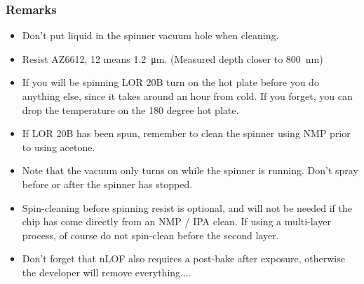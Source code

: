 \subsubsection{Remarks}
\begin{itemize}
\item Don't put liquid in the spinner vacuum hole when cleaning.
\item Resist AZ6612, 12 means \SI{1.2}{\micro\meter}. (Measured depth closer to \SI{800}{\nano\meter})
\item If you will be spinning LOR 20B turn on the hot plate before you do anything else, since it takes around an hour from cold. If you forget, you can drop the temperature on the 180 degree hot plate.
\item If LOR 20B has been spun, remember to clean the spinner using NMP prior to using acetone.
\item Note that the vacuum only turns on while the spinner is running. Don't spray before or after the spinner has stopped.
\item Spin-cleaning before spinning resist is optional, and will not be needed if the chip has come directly from an NMP / IPA clean. If using a multi-layer process, of course do not spin-clean before the second layer.
\item Don't forget that nLOF also requires a post-bake after exposure, otherwise the developer will remove everything....
\end{itemize}

\newpage
